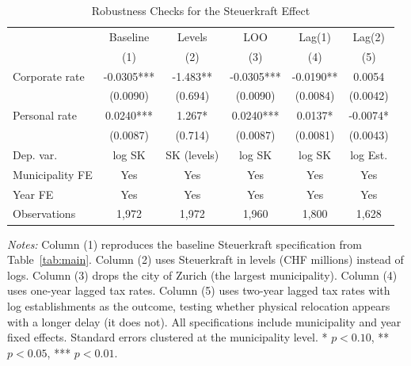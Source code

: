 \begin{table}[t]
\centering
\caption{Robustness Checks for the Steuerkraft Effect}
\label{tab:robust}
\begin{tabular}{lccccc}
\hline\hline
 & Baseline & Levels & LOO & Lag(1) & Lag(2) \\
 & (1) & (2) & (3) & (4) & (5) \\
\hline
Corporate rate & -0.0305*** & -1.483** & -0.0305*** & -0.0190** & 0.0054 \\
 & (0.0090) & (0.694) & (0.0090) & (0.0084) & (0.0042) \\
Personal rate & 0.0240*** & 1.267* & 0.0240*** & 0.0137* & -0.0074* \\
 & (0.0087) & (0.714) & (0.0087) & (0.0081) & (0.0043) \\
\hline
Dep. var. & log SK & SK (levels) & log SK & log SK & log Est. \\
Municipality FE & Yes & Yes & Yes & Yes & Yes \\
Year FE & Yes & Yes & Yes & Yes & Yes \\
Observations & 1,972 & 1,972 & 1,960 & 1,800 & 1,628 \\
\hline\hline
\end{tabular}
\begin{tablenotes}
\item \textit{Notes:} Column (1) reproduces the baseline Steuerkraft specification from Table~\ref{tab:main}. 
Column (2) uses Steuerkraft in levels (CHF millions) instead of logs. 
Column (3) drops the city of Zurich (the largest municipality). 
Column (4) uses one-year lagged tax rates. 
Column (5) uses two-year lagged tax rates with log establishments as the outcome, 
testing whether physical relocation appears with a longer delay (it does not). 
All specifications include municipality and year fixed effects. 
Standard errors clustered at the municipality level. 
* $p<0.10$, ** $p<0.05$, *** $p<0.01$.
\end{tablenotes}
\end{table}
